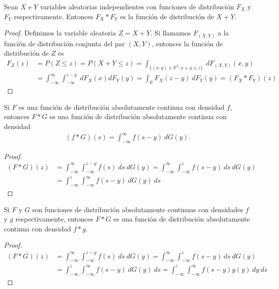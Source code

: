 \begin{teo}
    Sean $X$ e $Y$ variables aleatorias independientes con funciones de distribución $F_X$ y $F_Y$ respectivamente. Entonces $F_X*F_Y$ es la función de distribución de $X+Y$.
\end{teo}

\begin{proof}
Definimos la variable aleatoria $Z = X+Y$. Si llamamos $F_{(X,Y)}$ a la función de distribución conjunta del par $(X,Y)$, entonces la función de distribución de $Z$ es
\begin{align*}
    F_Z(z) &= P(Z \leq z) = P(X+Y \leq z) = \int_{\{(x,y) \in \mathbb{R}^2 : x+y\leq z \}} \ dF_{(X,Y)}(x,y) \\
    &= \int_{-\infty}^{\infty} \int_{-\infty}^{z-y} \ dF_X(x)dF_Y(y) = \int_{\mathbb{R}} F_X(z-y) \ dF_Y(y) = (F_X*F_Y)(z)
\end{align*}
\end{proof}

\begin{teo}
    Si $F$ es una función de distribución absolutamente continua con densidad $f$, entonces $F*G$ es una función de distribución absolutamente continua con densidad
    \begin{align*}
        (f*G)(s) = \int_{-\infty}^{\infty} f(s-y) \ dG(y).
    \end{align*}
\end{teo}

\begin{proof}
    \begin{align*}
        (F*G)(z) &= \int_{-\infty}^{\infty} \int_{-\infty}^{z-y} f(s) \ ds \ dG(y) = \int_{-\infty}^{\infty} \int_{-\infty}^{z} f(s-y) \ ds \ dG(y) \\
        &= \int_{-\infty}^{z} \int_{-\infty}^{\infty} f(s-y) \ dG(y) \ ds
    \end{align*}
\end{proof}

\begin{teo}
    Si $F$ y $G$ son funciones de distribución absolutamente continuas con densidades $f$ y $g$ respectivamente, entonces $F*G$ es una función de distribución absolutamente continua con densidad $f*g$.
\end{teo}

\begin{proof}
    \begin{align*}
        (F*G)(z) &= \int_{-\infty}^{\infty} \int_{-\infty}^{z-y} f(s) \ ds \ dG(y) = \int_{-\infty}^{\infty} \int_{-\infty}^{z} f(s-y) \ ds \ dG(y) \\
        &= \int_{-\infty}^{z} \int_{-\infty}^{\infty} f(s-y) \ dG(y) \ ds = \int_{-\infty}^{z} \int_{-\infty}^{\infty} f(s-y) g(y) \ dy \ ds
    \end{align*}
\end{proof}


